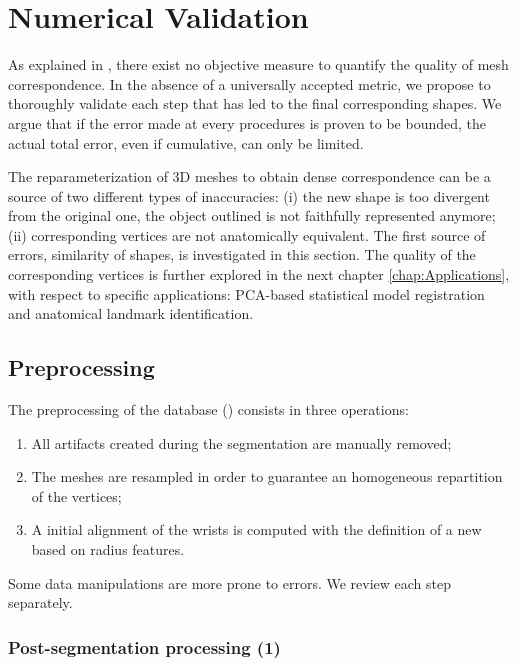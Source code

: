 \section{Numerical Validation}
\label{sec:4_Validation}

As explained in , there exist no objective measure to quantify the quality of mesh correspondence. In the absence of a universally accepted metric, we propose to thoroughly validate each step that has led to the final corresponding shapes. We argue that if the error made at every procedures is proven to be bounded, the actual total error, even if cumulative, can only be limited.

The reparameterization of 3D meshes to obtain dense correspondence can be a source of two different types of inaccuracies: (i) the new shape is too divergent from the original one, the object outlined is not faithfully represented anymore; (ii) corresponding vertices are not anatomically equivalent. The first source of errors, similarity of shapes, is investigated in this section. The quality of the corresponding vertices is further explored in the next chapter \ref{chap:Applications}, with respect to specific applications: PCA-based statistical model registration and anatomical landmark identification.




\subsection{Preprocessing}
\label{subsec:3:Results_preprocessing}

The preprocessing of the database () consists in three operations: 
\begin{enumerate}[(1)]
	\item All artifacts created during the segmentation are manually removed;
	\item The meshes are resampled in order to guarantee an homogeneous repartition of the vertices; 
	\item A initial alignment of the wrists is computed with the definition of a new \soc* based on radius features.
\end{enumerate}

Some data manipulations are more prone to errors. We review each step separately.


\subsubsection{Post-segmentation processing (1)}
\label{ssubsec:post_segmentation_validation}

